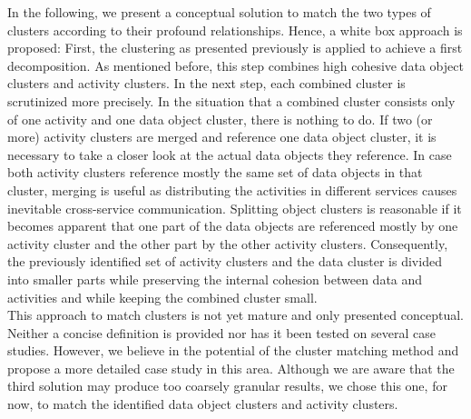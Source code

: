 In the following, we present a conceptual solution to match the two types of clusters according to their profound relationships. Hence, a white box approach is proposed: First, the clustering as presented previously is applied to achieve a first decomposition. As mentioned before, this step combines high cohesive data object clusters and activity clusters. In the next step, each combined cluster is scrutinized more precisely. In the situation that a combined cluster consists only of one activity and one data object cluster, there is nothing to do. If two (or more) activity clusters are merged and reference one data object cluster, it is necessary to take a closer look at the actual data objects they reference. In case both activity clusters reference mostly the same set of data objects in that cluster, merging is useful as distributing the activities in different services causes inevitable cross-service communication. Splitting object clusters is reasonable if it becomes apparent that one part of the data objects are referenced mostly by one activity cluster and the other part by the other activity clusters. Consequently, the previously identified set of activity clusters and the data cluster is divided into smaller parts while preserving the internal cohesion between data and activities and while keeping the combined cluster small. \\
This approach to match clusters is not yet mature and only presented conceptual. Neither a concise definition is provided nor has it been tested on several case studies. However, we believe in the potential of the cluster matching method and propose a more detailed case study in this area. Although we are aware that the third solution may produce too coarsely granular results, we chose this one, for now, to match the identified data object clusters and activity clusters. \\





